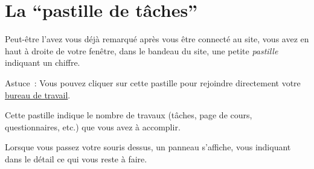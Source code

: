% 
% 
% 
% 
% 
% 
% 
% 

\section{La “pastille de tâches”}\hypertarget{pastille-taches}{}\label{pastille-taches}

Peut-être l'avez vous déjà remarqué après vous être connecté au site, vous avez en haut à droite de votre fenêtre, dans le bandeau du site, une petite \emph{pastille} indiquant un chiffre.


Astuce~{}: Vous pouvez cliquer sur cette pastille pour rejoindre directement votre \hyperlink{bureau}{bureau de travail}.

Cette pastille indique le nombre de travaux (tâches, page de cours, questionnaires, etc.) que vous avez à accomplir.

Lorsque vous passez votre souris dessus, un panneau s'affiche, vous indiquant dans le détail ce qui vous reste à faire.


